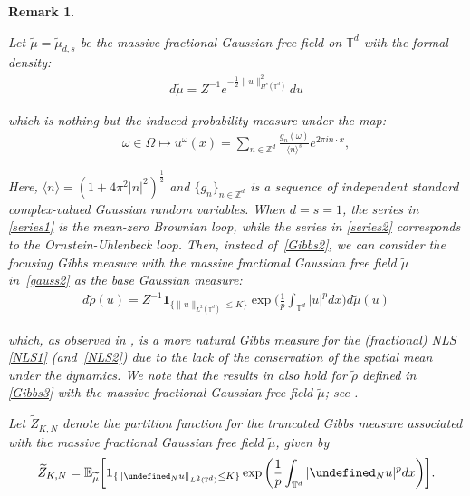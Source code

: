 \documentclass[letterpaper, 11pt,  reqno]{amsart}
\newtheorem{remark}[theorem]{Remark}
\newcommand{\noi}{\noindent}
\newcommand{\Z}{\mathbb{Z}}
\newcommand{\T}{\mathbb{T}}
\let\P= \undefined
\newcommand{\P}{\mathbf{P}}
\newcommand{\E}{\mathbb{E}}
\newcommand{\wt}{\widetilde}
\newcommand{\jb}[1]
{\langle #1 \rangle}
\newcommand{\ind}{\mathbf 1}
\numberwithin{equation}{section}
\numberwithin{theorem}{section}
\begin{document}
\begin{remark}\label{REM:mean}
\rm 


Let $\wt \mu = \wt \mu_{d, s}$ be 
the {\it massive}
fractional Gaussian free field on $\T^d$
with 
the formal density: 
\begin{align}
d \wt \mu =  Z^{-1} e^{-\frac 12 \|u\|_{H^s(\T^d)}^2} d u
\label{gauss2}
\end{align}

\noi
which is nothing but   the induced probability measure under the map:
\begin{align}
\omega\in \Omega \longmapsto u^\omega(x) = 
\sum_{n \in \mathbb{Z}^d} \frac{g_n (\omega)}{ \jb{n}^s}  e^{2\pi i n\cdot x},
\label{series2}
\end{align}


\noi
Here,  $\jb{n} = (1 + 4\pi^2 |n|^2)^\frac{1}{2}$
and 
$\{ g_n \}_{n \in \Z^d}$
is a sequence of  independent standard complex-valued
Gaussian random variables.
When $d = s= 1$, 
the series in \eqref{series1}
is  the mean-zero Brownian loop, 
while the series in \eqref{series2}
corresponds to 
 the Ornstein-Uhlenbeck loop.
Then, instead of~\eqref{Gibbs2}, 
we can consider the focusing Gibbs measure %
with 
the massive fractional Gaussian free field
$\wt \mu$ in~\eqref{gauss2} as the base Gaussian measure:
\begin{align}
d\wt \rho (u) = Z^{-1}
\ind_{\{\|u\|_{L^2(\mathbb{T}^d)}\le K\}}
\exp \bigg(\frac{1}{p} \int_{\mathbb{T}^d} |u|^p dx \bigg) d\wt \mu (u)
\label{Gibbs3}
\end{align}







\noi
which, as observed in \cite{BO94},  is a more natural Gibbs measure
for the (fractional) NLS \eqref{NLS1} (and~\eqref{NLS2})
due to the lack of the conservation of the spatial mean under the dynamics.
We note that  the results in \cite{LRS, OST1}
also hold for $\wt \rho$ defined in \eqref{Gibbs3}
with the massive fractional Gaussian free field
$\wt \mu$; see \cite[Remark~1.2]{OST1}.




Let 
$\wt Z_{K, N}$ denote the partition function
for the truncated Gibbs measure associated 
with the massive fractional Gaussian free field $\wt \mu$, 
 given by
\begin{align*}
\wt Z_{K, N} = 
\E_{\wt \mu}\bigg[
\ind_{\{ \| \P_{N} u \|_{L^2 (\mathbb{T}^d)}\leq K \}} \exp\bigg( \frac 1 p\int_{\mathbb{T}^d}  | \P_{N} u|^p   dx \bigg)\bigg].
\end{align*}



\end{remark}
\end{document}
